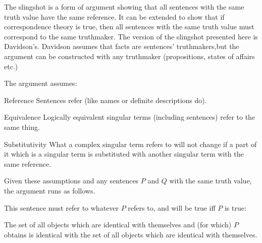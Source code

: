 The slingshot is a form of argument showing that all sentences with the same truth value have the same reference. %
It can be extended to show that if correspondence theory is true, then all sentences with the same truth value must correspond to the same truthmaker.
The version of the slingshot presented here is Davidson's.
\parencite[753]{Davidson_1969}
Davidson assumes that facts are sentences' truthmakers,\footnotemark but the argument can be constructed with any truthmaker (propositions, states of affairs etc.)
\parencite[752]{Davidson_1969}

The argument assumes:
\parencite[753]{Davidson_1969}

	\begin{principle}{Reference}\label{srefer}
	Sentences refer (like names or definite descriptions do).
	\end{principle}

	\begin{principle}{Equivalence}\label{sameref}
	Logically equivalent singular terms (including sentences) refer to the same thing.
	\end{principle}

	\begin{principle}{Substitutivity}\label{constref}
	What a complex singular term refers to will not change if a part of it which is a singular term is substituted with another singular term with the same reference.
	\end{principle}


Given these assumptions and any sentences $P$ and $Q$ with the same truth value, the argument runs as follows.

This sentence must refer to whatever $P$ refers to, and will be true iff $P$ is true:

	\begin{example}\label{setP}
	The set of all objects which are identical with themselves and (for which) $P$ obtains is identical with the set of all objects which are identical with themselves.
	\end{example}

